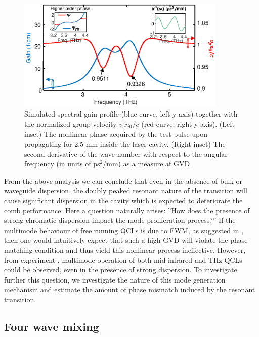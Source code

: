\documentclass[10pt,letterpaper]{article}%
\begin{document}
\begin{figure}[h]
\begin{center}
\includegraphics[width=10cm]{figs/THZtds.eps}
\end{center}
\caption{Simulated spectral gain profile (blue curve, left y-axis) together
with the normalized group velocity $v_{g}n_{0}/c$ (red curve, right y-axis).
(Left inset) The nonlinear phase acquired by the test pulse upon propagating
for 2.5 mm inside the laser cavity. (Right inset) The second derivative of the
wave number with respect to the angular frequency (in units of ps$^{2}$/mm) as
a measure af GVD. }%
\label{fig:img03}%
\end{figure}

From the above analysis we can conclude that even in the absence of bulk or
waveguide dispersion, the doubly peaked resonant nature of the transition will
cause significant dispersion in the cavity which is expected to deteriorate
the comb performance. Here a question naturally arises: ''How does the
presence of strong chromatic dispersion impact the mode proliferation
process?'' If the multimode behaviour of free running QCLs is due to FWM, as
suggested in \cite{friedli2013four,khurgin2014coherent}, then one would
intuitively expect that such a high GVD will violate the phase matching
condition and thus yield this nonlinear process ineffective. However, from
experiment \cite{burghoff2014terahertz,rosch2015octave}, multimode operation
of both mid-infrared and THz QCLs could be observed, even in the presence of
strong dispersion. To investigate further this question, we investigate the
nature of this mode generation mechanism and estimate the amount of phase
mismatch induced by the resonant transition.

\subsection{Four wave mixing}

\label{subsec:FWM}
\end{document}
